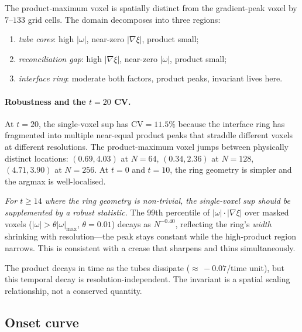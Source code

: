 \documentclass[11pt,a4paper]{article}
\theoremstyle{definition}
\newcommand{\grad}{\nabla}
\newcommand{\abs}[1]{\lvert #1 \rvert}
\newcommand{\weakclaim}[1]{\emph{#1}}      %
\begin{document}
The product-maximum voxel is spatially
distinct from the gradient-peak voxel by $7$--$133$ grid cells.  The
domain decomposes into three regions:
\begin{enumerate}[label=(\roman*)]
  \item \emph{tube cores}: high $\abs{\omega}$, near-zero
    $\abs{\grad\xi}$, product small;
  \item \emph{reconciliation gap}: high $\abs{\grad\xi}$, near-zero
    $\abs{\omega}$, product small;
  \item \emph{interface ring}: moderate both factors, product peaks,
    invariant lives here.
\end{enumerate}

\paragraph{Robustness and the $t{=}20$ CV.}
At $t{=}20$, the single-voxel sup has $\mathrm{CV}=11.5\%$ because
the interface ring has fragmented into multiple near-equal product
peaks that straddle different voxels at different resolutions.  The
product-maximum voxel jumps between physically distinct
locations: $(0.69, 4.03)$ at $N{=}64$, $(0.34, 2.36)$ at $N{=}128$,
$(4.71, 3.90)$ at $N{=}256$.  At $t=0$ and $t=10$, the ring geometry
is simpler and the argmax is well-localised.

\weakclaim{For $t\geq14$ where the ring geometry is non-trivial, the
single-voxel sup should be supplemented by a robust statistic.}
The 99th percentile of $\abs{\omega}\cdot\abs{\grad\xi}$ over
masked voxels ($\abs{\omega}>\theta\abs{\omega}_{\max}$,
$\theta=0.01$) decays as $N^{-0.40}$, reflecting the ring's
\emph{width} shrinking with resolution---the peak stays constant
while the high-product region narrows.  This is consistent with a
crease that sharpens and thins simultaneously.

The product decays in time as the tubes dissipate (${\approx}\,-0.07$/time
unit), but this temporal decay is resolution-independent.  The
invariant is a spatial scaling relationship, not a conserved quantity.

\subsection{Onset curve}
\end{document}
